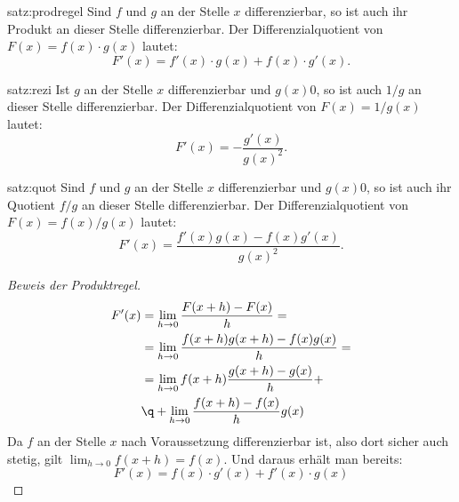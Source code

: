 \documentclass[%
11pt,%
twoside,%
titlepage,%
german,%
headsepline%
]{scrartcl}
\begin{document}
\begin{csatz}{satz:prodregel}
Sind
$f$ und $g$ an der Stelle $x$ differenzierbar, so ist auch ihr Produkt an dieser Stelle differenzierbar. Der Differenzialquotient von $F(x)=f(x)\cdot g(x)$ lautet:
$$F'(x)=f'(x)\cdot g(x)+f(x)\cdot g'(x).$$
\end{csatz}
\begin{csatz}{satz:rezi}
Ist
$g$ an der Stelle $x$ differenzierbar und $g(x)­0$, so ist auch $1/g$ an dieser Stelle differenzierbar. Der Differenzialquotient von $F(x)=1/g(x)$ lautet:
$$F'(x)=-\frac{g'(x)}{g(x)^2}.$$
\end{csatz}
\begin{csatz}{satz:quot}
Sind $f$ und $g$ an der Stelle $x$ differenzierbar und $g(x)­0$, so ist auch ihr Quotient $f/g$ an dieser Stelle differenzierbar. Der Differenzialquotient von $F(x)=f(x)/g(x)$ lautet:
$$F'(x)=\frac{f'(x)g(x)-f(x)g'(x)}{g(x)^2}.$$
\end{csatz}
\begin{proof}[Beweis der Produktregel]
\begin{align*}
F'(x)&=\lim_{h\to0}\frac{F(x+h)-F(x)}{h}=\\
&=\lim_{h\to0}\frac{f(x+h)g(x+h)-f(x)g(x)}{h}=\\
&=\lim_{h\to0}f(x+h)\frac{g(x+h)-g(x)}{h}+\\
&\q+\lim_{h\to0}\frac{f(x+h)-f(x)}{h}g(x)
\end{align*}
Da $f$ an der Stelle $x$ nach Voraussetzung differenzierbar ist, also dort sicher auch stetig, gilt $\lim_{h\to0}f(x+h)=f(x)$. Und daraus erh\"alt man bereits:
$$F'(x)=f(x)\cdot g'(x)+f'(x)\cdot g(x)$$
\end{proof}
\end{document}
